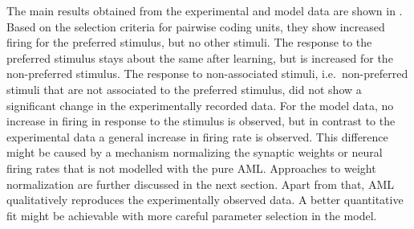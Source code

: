 The main results obtained from the experimental and model data are shown in .
Based on the selection criteria for pairwise coding units, they show increased firing for the preferred stimulus, but no other stimuli.
The response to the preferred stimulus stays about the same after learning, but is increased for the non-preferred stimulus.
The response to non-associated stimuli, i.e.\ non-preferred stimuli that are not associated to the preferred stimulus, did not show a significant change in the experimentally recorded data.
For the model data, no increase in firing in response to the stimulus is observed, but in contrast to the experimental data a general increase in firing rate is observed.
This difference might be caused by a mechanism normalizing the synaptic weights or neural firing rates that is not modelled with the pure AML\@.
Approaches to weight normalization are further discussed in the next section.
Apart from that, AML qualitatively reproduces the experimentally observed data.
A better quantitative fit might be achievable with more careful parameter selection in the model.
